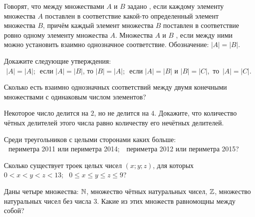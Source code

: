 \documentclass[a4paper,12pt]{article}
\begin{document}



Говорят, что между множествами $A$ и $B$ задано
, если каждому элементу множества $A$
поставлен в соответствие какой-то определенный элемент множества $B$,
причём каждый элемент множества $B$ поставлен в соответствие ровно
одному элементу множества $A$. Множества $A$ и $B$ %
, если между ними можно установить взаимно
однозначное соответствие.
Обозначение: $|A| = |B|$.

 Докажите следующие утверждения:\\
 $\!\!\!$ $|A| = |A|$;
 $\!\!\!$ если $|A| = |B|$, то $|B| = |A|$;
 $\!\!\!$ если $|A| = |B|$ и $|B| = |C|$,~то~\hbox{$|A| = |C|$.}


Сколько есть взаимно однозначных соответствий между двумя конечными множествами с одинаковым числом элементов?



Некоторое число делится на $2$, но не делится на $4$. Докажите, что
количество ч\"етных делителей этого числа равно количеству
его неч\"етных делителей.

Среди треугольников с целыми сторонами
каких больше:\\
$\!\!\!$
$\!\!\!$ периметра 2011 или периметра
2014;
$\!\!\!$ 
$\!\!\!$ периметра 2012 или периметра 2015?

Сколько существует
троек целых чисел $(x;y;z)$, для которых\\
 $0<x<y<z<13$;
~\hbox{$0\leq x\leq y\leq z\leq9$?}

Даны четыре множества: $\mathbb{N}$, множество чётных натуральных
чисел, $\mathbb{Z}$, множество натуральных чисел без числа 3.
Какие из этих множеств равномощны между собой?
\end{document}
